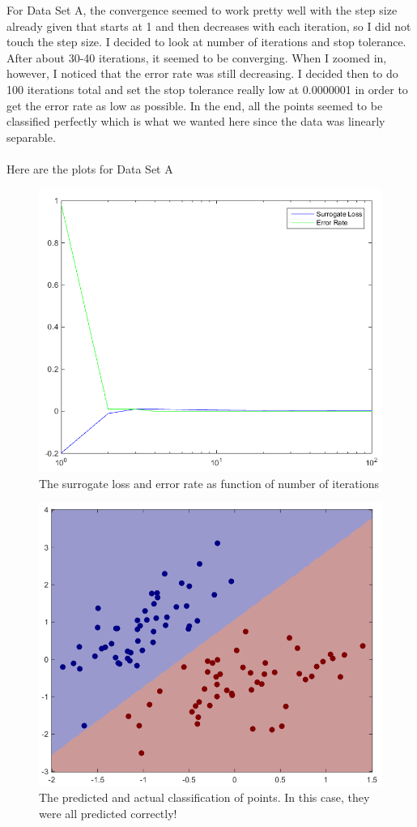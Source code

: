 \documentclass[twoside,11pt]{article}
\theoremstyle{definition}
\begin{document}
For Data Set A, the convergence seemed to work pretty well with the step size already given that starts at 1 and then decreases with each iteration, so I did not touch the step size. I decided to look at number of iterations and stop tolerance. After about 30-40 iterations, it seemed to be converging. When I zoomed in, however, I noticed that the error rate was still decreasing. I decided then to do 100 iterations total and set the stop tolerance really low at 0.0000001 in order to get the error rate as low as possible. In the end, all the points seemed to be classified perfectly which is what we wanted here since the data was linearly separable. \\
\\
Here are the plots for Data Set A
\begin{figure}[h]
\centering
\includegraphics[width=6 in]{prob1fPlotA1.png}
\caption{The surrogate loss and error rate as function of number of iterations}
\end{figure}
\begin{figure}[h]
\centering
\includegraphics[width=6 in]{prob1fPlotA2.png}
\caption{The predicted and actual classification of points. In this case, they were all predicted correctly!}
\end{figure}
\end{document}
